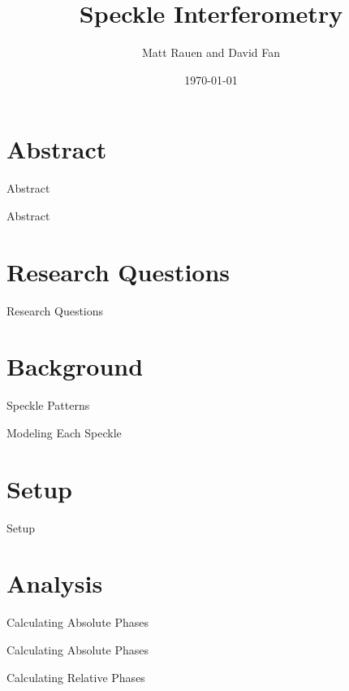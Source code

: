\documentclass[pdf]{beamer}
\title{Speckle Interferometry}
\author{Matt Rauen and David Fan}
\date{\today}
\begin{document}
\begin{frame}
\titlepage
\end{frame}

\section{Abstract}
\begin{frame}{Abstract}

\end{frame}{Abstract}

\section{Research Questions}
\begin{frame}{Research Questions}

\end{frame}

\section{Background}
\begin{frame}{Speckle Patterns}

\end{frame}

\begin{frame}{Modeling Each Speckle}

\end{frame}

\section{Setup}
\begin{frame}{Setup}

\end{frame}

\section{Analysis}
\begin{frame}{Calculating Absolute Phases}

\end{frame}

\begin{frame}{Calculating Absolute Phases}

\end{frame}

\begin{frame}{Calculating Relative Phases}

\end{frame}
\end{document}
